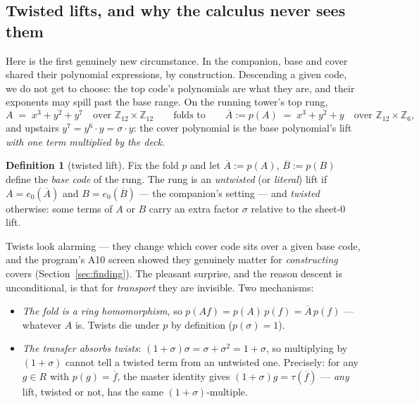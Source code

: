 \documentclass[11pt]{article}
\theoremstyle{plain}
\theoremstyle{definition}
\newtheorem{definition}[theorem]{Definition}
\theoremstyle{remark}
\newcommand{\Z}{\mathbb{Z}}
\newcommand{\Rcov}{R}
\newcommand{\ov}[1]{\overline{#1}}
\begin{document}
\subsection{Twisted lifts, and why the calculus never sees them}
\label{sec:twists}

Here is the first genuinely new circumstance. In the companion, base and
cover shared their polynomial expressions, by construction. Descending a
given code, we do not get to choose: the top code's polynomials are what
they are, and their exponents may spill past the base range. On the
running tower's top rung,
\[
A \;=\; x^3 + y^2 + y^7 \quad\text{over } \Z_{12}\times\Z_{12}
\qquad\text{folds to}\qquad
\ov A := p(A) \;=\; x^3 + y^2 + y \quad\text{over } \Z_{12}\times\Z_6 ,
\]
and upstairs $y^7 = y^6 \cdot y = \sigma \cdot y$: the cover polynomial is
the base polynomial's lift \emph{with one term multiplied by the deck}.

\begin{definition}[twisted lift]\label{def:twist}
Fix the fold $p$ and let $\ov A := p(A)$, $\ov B := p(B)$ define the
\emph{base code} of the rung. The rung is an \emph{untwisted} (or
\emph{literal}) lift if $A = e_0(\ov A)$ and $B = e_0(\ov B)$ --- the
companion's setting --- and \emph{twisted} otherwise: some terms of $A$ or
$B$ carry an extra factor $\sigma$ relative to the sheet-$0$ lift.
\end{definition}

Twists look alarming --- they change which cover code sits over a given
base code, and the program's A10 screen showed they genuinely matter for
\emph{constructing} covers (Section~\ref{sec:finding}). The pleasant
surprise, and the reason descent is unconditional, is that for
\emph{transport} they are invisible. Two mechanisms:

\begin{itemize}[leftmargin=2em]
\item \emph{The fold is a ring homomorphism}, so $p(Af) = p(A)\,p(f) =
  \ov A\, p(f)$ --- whatever $A$ is. Twists die under $p$ by definition
  ($p(\sigma) = 1$).
\item \emph{The transfer absorbs twists}: $(1+\sigma)\sigma = \sigma +
  \sigma^2 = 1 + \sigma$, so multiplying by $(1+\sigma)$ cannot tell a
  twisted term from an untwisted one. Precisely: for any $g \in \Rcov$
  with $p(g) = \ov f$, the master identity gives $(1+\sigma)g =
  \tau(\ov f)$ --- \emph{any} lift, twisted or not, has the same
  $(1+\sigma)$-multiple.
\end{itemize}
\end{document}
